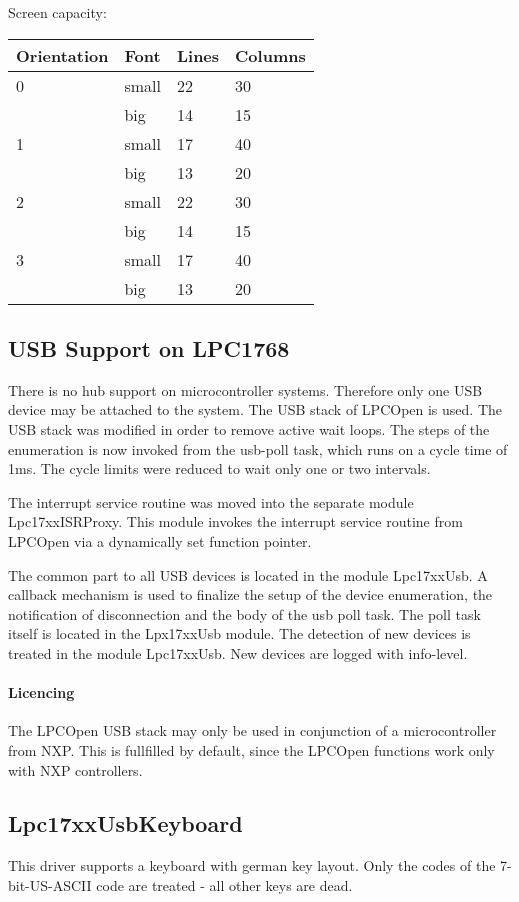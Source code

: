 Screen capacity:

\begin{tabular}{|l|l|l|l|}
\hline
Orientation & Font & Lines & Columns \\
\hline
 0 & small & 22 & 30  \\
   & big   & 14 & 15 \\
\hline
1 & small & 17 & 40 \\
  & big &   13 & 20 \\
\hline
 2 & small & 22 & 30  \\
   & big   & 14 & 15 \\
\hline
3 & small & 17 & 40 \\
  & big &   13 & 20 \\
\hline
\end{tabular}

\subsection{USB Support on LPC1768}
There is no hub support on microcontroller systems. Therefore only one USB device
may be attached to the system.
The USB stack of LPCOpen is used.
The USB stack was modified in order to remove active wait loops.
The steps of the enumeration is now invoked from the usb-poll task, which
runs on a cycle time of 1ms.
The cycle limits were reduced to wait only one 
or two intervals.

The interrupt service routine was moved into the separate module
 Lpc17xxISRProxy. 
This module invokes the interrupt service routine from LPCOpen via a
 dynamically set function pointer.

The common part to all USB devices is located in the module Lpc17xxUsb. 
A callback mechanism is used to finalize the setup of the device enumeration,
the notification of disconnection and the body of the usb poll task. The poll task
itself is located in the Lpx17xxUsb module.
The detection of new devices is treated in the module Lpc17xxUsb. New devices are logged 
with info-level.

\paragraph{Licencing}
The LPCOpen USB stack may only be used in conjunction of a microcontroller from NXP.
This is fullfilled by default, since the LPCOpen functions work only with NXP
controllers.

\subsection{Lpc17xxUsbKeyboard}
This driver supports a keyboard with german key layout.
Only the codes of the 7-bit-US-ASCII code are treated - all other
keys are dead.

